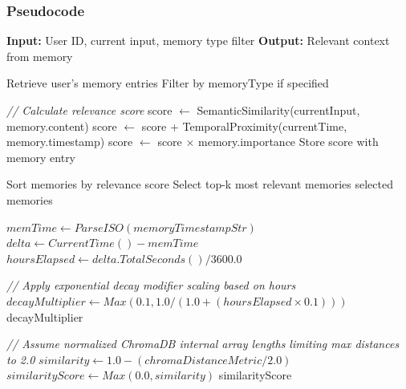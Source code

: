 \documentclass[11pt]{report}
\begin{document}
\subsubsection*{Pseudocode}
\begin{algorithm}[H]
\caption{Contextual Memory Retrieval}
\label{alg:memory_retrieval}
\begin{algorithmic}[1]
    \State \textbf{Input:} User ID, current input, memory type filter
    \State \textbf{Output:} Relevant context from memory
    
    \State Retrieve user's memory entries
    \State Filter by memoryType if specified
    
        \State \textit{// Calculate relevance score}
        \State score $\gets$ SemanticSimilarity(currentInput, memory.content)
        \State score $\gets$ score + TemporalProximity(currentTime, memory.timestamp)
        \State score $\gets$ score $\times$ memory.importance
        \State Store score with memory entry
    \EndFor
    
    \State Sort memories by relevance score
    \State Select top-k most relevant memories
    \State \Return selected memories
\EndProcedure
\end{algorithmic}
\end{algorithm}

\begin{algorithm}[H]
\caption{Calculate Temporal Proximity Decay}
\label{alg:memory_decay}
\begin{algorithmic}[1]
    \State $memTime \gets ParseISO(memoryTimestampStr)$
    \State $delta \gets CurrentTime() - memTime$
    \State $hoursElapsed \gets delta.TotalSeconds() / 3600.0$
    
    \State \textit{// Apply exponential decay modifier scaling based on hours}
    \State $decayMultiplier \gets Max(0.1, 1.0 / (1.0 + (hoursElapsed \times 0.1)))$
    \State \Return decayMultiplier
\EndProcedure
\end{algorithmic}
\end{algorithm}

\begin{algorithm}[H]
\caption{Calculate Semantic Cosine Similarity}
\label{alg:memory_cosine}
\begin{algorithmic}[1]
    \State \textit{// Assume normalized ChromaDB internal array lengths limiting max distances to 2.0}
    \State $similarity \gets 1.0 - (chromaDistanceMetric / 2.0)$
    \State $similarityScore \gets Max(0.0, similarity)$
    \State \Return similarityScore
\EndProcedure
\end{algorithmic}
\end{algorithm}
\end{document}
